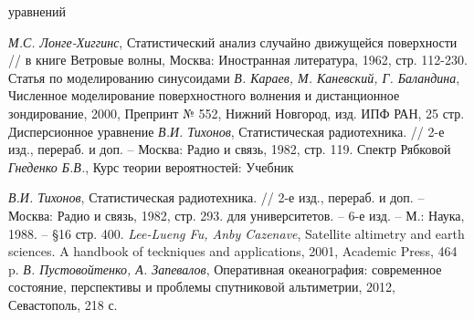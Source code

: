 \documentclass[a4paper,14pt]{extarticle}
\begin{document}
уравнений
\begin{thebibliography}{}
     \textit{М.С. Лонге-Хиггинс}, Статистический анализ случайно
    движущейся поверхности // в книге Ветровые волны, Москва: Иностранная
    литература, 1962, стр. 112-230.
     Статья по моделированию синусоидами 
     \textit{В. Караев, М. Каневский, Г. Баландина}, Численное
    моделирование поверхностного волнения и дистанционное зондирование, 2000,
    Препринт № 552, Нижний Новгород, изд. ИПФ РАН, 25 стр. 
     Дисперсионное уравнение
     \textit{В.И. Тихонов}, Статистическая радиотехника. // 2-е
    изд., перераб. и доп. -- Москва: Радио и связь, 1982, стр. 119.
     Спектр Рябковой
     \textit{Гнеденко Б.В.}, Курс теории вероятностей: Учебник

     \textit{В.И. Тихонов}, Статистическая радиотехника. // 2-е
    изд., перераб. и доп. -- Москва: Радио и связь, 1982, стр. 293.
    для университетов. -- 6-е изд.  -- М.: Наука, 1988. -- \S 16 
    стр. 400.
     \textit{Lee-Lueng Fu, Anby Cazenave}, Satellite altimetry
    and earth sciences. A handbook of teckniques and applications, 2001,
    Academic Press, 464 p.
     \textit{В. Пустовойтенко, А. Запевалов}, Оперативная
    океанография: современное состояние, перспективы и проблемы спутниковой
    альтиметрии, 2012, Севастополь, 218 с.
    \end{thebibliography}
\end{document}
